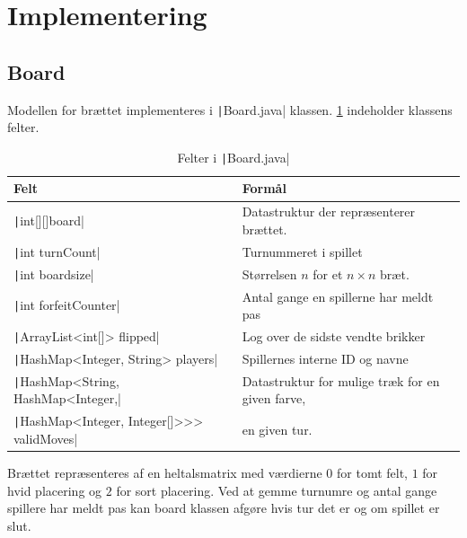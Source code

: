 \section{Implementering}

\subsection{Board}\label{sec:boardImplement}
Modellen for brættet implementeres i \texttt|Board.java| klassen. \cref{tbl:boardfields} indeholder klassens felter.
\begin{table}[H]
    \centering
    \caption{Felter i \texttt|Board.java|}\label{tbl:boardfields}
    \begin{tabular}{ll}
        \toprule
        Felt                                                              & Formål                                           \\
        \midrule
        \texttt|int[][]board|                                   & Datastruktur der repræsenterer brættet.          \\
        \texttt|int turnCount|                                  & Turnummeret i spillet                            \\
        \texttt|int boardsize|                                  & Størrelsen \(n\) for et \(n\times n\) bræt.      \\
        \texttt|int forfeitCounter|                             & Antal gange en spillerne har meldt pas           \\
        \texttt|ArrayList<int[]> flipped|                       & Log over de sidste vendte brikker                \\
        \texttt|HashMap<Integer, String> players|               & Spillernes interne ID og navne                   \\
        \texttt|HashMap<String, HashMap<Integer,|               & Datastruktur for mulige træk for en given farve, \\
        \quad \texttt|HashMap<Integer, Integer[]>>> validMoves| & en given tur.                                    \\
        \bottomrule
    \end{tabular}
\end{table}
Brættet repræsenteres af en heltalsmatrix med værdierne \(0\) for tomt felt, \(1\) for hvid placering og \(2\) for sort placering. Ved at gemme turnumre og antal gange spillere har meldt pas kan board klassen afgøre hvis tur det er og om spillet er slut.
